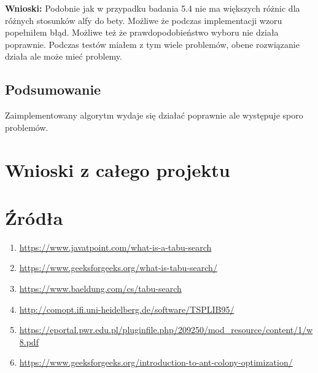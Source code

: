 \documentclass{article}
\begin{document}
        \FloatBarrier
        \textbf{Wnioski: } Podobnie jak w przypadku badania 5.4 nie ma większych różnic
        dla różnych stosunków alfy do bety. Możliwe że podczas implementacji wzoru 
        popełniłem błąd. Możliwe też że prawdopodobieństwo wyboru nie działa poprawnie.
        Podczas testów miałem z tym wiele problemów, obene rozwiązanie działa ale może mieć problemy.
      \subsection{Podsumowanie}
        Zaimplementowany algorytm wydaje się działać poprawnie ale występuje sporo problemów.
    \section{Wnioski z całego projektu}


    \section{Źródła}
      \begin{enumerate}[label=\arabic*.]
        \item \url{https://www.javatpoint.com/what-is-a-tabu-search}
        \item \url{https://www.geeksforgeeks.org/what-is-tabu-search/}
        \item \url{https://www.baeldung.com/cs/tabu-search}
        \item \url{http://comopt.ifi.uni-heidelberg.de/software/TSPLIB95/} \label{src:TspLib}
        \item \url{https://eportal.pwr.edu.pl/pluginfile.php/209250/mod_resource/content/1/w8.pdf}
        \item \url{https://www.geeksforgeeks.org/introduction-to-ant-colony-optimization/}
      \end{enumerate}
\end{document}
